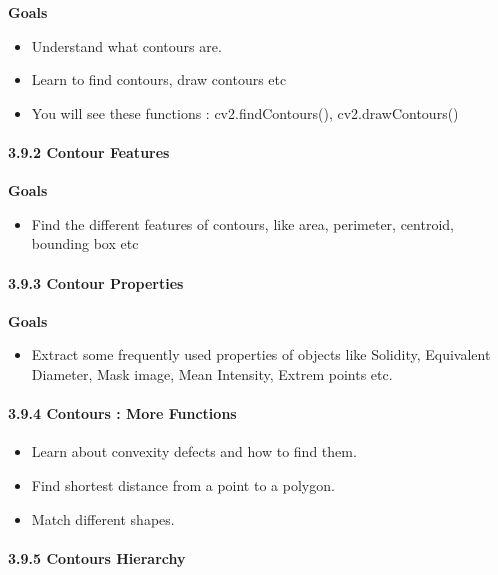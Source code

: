 \documentclass[11pt]{article}
\providecommand{\tightlist}{%
      \setlength{\itemsep}{0pt}\setlength{\parskip}{0pt}}
\begin{document}
\textbf{Goals}

\begin{itemize}
\item
  Understand what contours are.
\item
  Learn to find contours, draw contours etc
\item
  You will see these functions : cv2.findContours(), cv2.drawContours()
\end{itemize}

    \paragraph{3.9.2 Contour Features}\label{contour-features}

\textbf{Goals}

\begin{itemize}
\tightlist
\item
  Find the different features of contours, like area, perimeter,
  centroid, bounding box etc
\end{itemize}

    \paragraph{3.9.3 Contour Properties}\label{contour-properties}

\textbf{Goals}

\begin{itemize}
\tightlist
\item
  Extract some frequently used properties of objects like Solidity,
  Equivalent Diameter, Mask image, Mean Intensity, Extrem points etc.
\end{itemize}

    \paragraph{3.9.4 Contours : More
Functions}\label{contours-more-functions}

\begin{itemize}
\item
  Learn about convexity defects and how to find them.
\item
  Find shortest distance from a point to a polygon.
\item
  Match different shapes.
\end{itemize}

    \paragraph{3.9.5 Contours Hierarchy}\label{contours-hierarchy}
\end{document}
